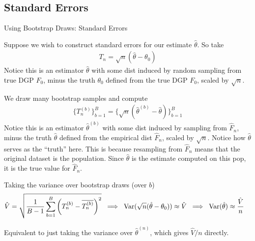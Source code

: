 \documentclass[aspectratio=169, handout]{beamer}
\newcommand{\Var}{\operatorname{Var}}
\begin{document}
\subsection{Standard Errors}

{\scriptsize
\begin{frame}{Using Bootstrap Draws: Standard Errors}
\begin{itemize}
  {\scriptsize
  \item Suppose we wish to construct standard errors for our estimate
    $\hat{\theta}$. So take
    \begin{align*}
      T_n=\sqrt{n}(\hat{\theta}-\theta_0)
    \end{align*}
    Notice this is an estimator $\hat{\theta}$ with some
    dist induced by random sampling from true DGP $F_0$,
    minus the truth $\theta_0$ defined from the true DGP $F_0$, scaled
    by $\sqrt{n}$.


  \item
    We draw many bootstrap samples and compute
    \begin{align*}
      \big\{T^{(b)}_n\big\}_{b=1}^B
      =
      \big\{\sqrt{n}(\hat{\theta}^{(b)}-\hat{\theta})\}_{b=1}^B
    \end{align*}
    Notice this is an estimator $\hat{\theta}^{(b)}$ with some
    dist induced by sampling from $\hat{F}_n$,
    minus the truth $\hat{\theta}$ defined from the empirical
    dist $\hat{F}_n$, scaled by $\sqrt{n}$.
    Notice how $\hat{\theta}$ serves as the ``truth'' here.
    This is because resampling from $\hat{F}_n$ means that the
    original dataset \alert{is} the population.
    Since $\hat{\theta}$ is the estimate computed on this pop, it is the
    true value for $\hat{F}_n$.

  \item
    Taking the variance over bootstrap draws (over $b$)
    \begin{align*}
      \hat{V}
      =
      \sqrt{%
        \frac{1}{B-1}
        \sum_{b=1}^B
        \bigg(
        T_n^{(b)}-\overline{T_n^{(b)}}
        \bigg)^2
      }
      \;\implies\;
      \Var(\sqrt{n}(\hat{\theta}-\theta_0))
      &\approx
      \hat{V}
      \;\implies\;
      \Var(\hat{\theta})
      \approx
      \frac{\hat{V}}{n}
    \end{align*}

  \item
    Equivalent to just taking the variance over $\hat{\theta}^{(n)}$,
    which gives $\hat{V}/n$ directly.
  }
\end{itemize}
\end{frame}
}
\end{document}
